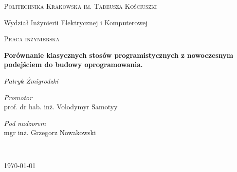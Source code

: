 \begin{titlepage}
	\centering
	{\scshape\LARGE Politechnika Krakowska 
	\break im. Tadeusza Kościuszki \par}
	\vspace{0.5cm}
	{\large Wydział Inżynierii Elektrycznej i Komputerowej\par}
	\vspace{1cm}
	{\scshape\LARGE Praca inżynierska\par}
	\vspace{1.5cm}
	{\LARGE\bfseries Porównanie klasycznych stosów programistycznych z nowoczesnym podejściem do budowy oprogramowania.\par}
	\vspace{1.5cm}
	{\LARGE\itshape Patryk Żmigrodzki\par}
	\vspace{1cm}

	\vfill
	
		\begin{minipage}{0.4\textwidth}
			\begin{flushleft} \large
				\emph{Promotor}\\
				prof. dr hab. inż. Volodymyr Samotyy
			\end{flushleft}
		\end{minipage}
		\begin{minipage}{0.4\textwidth}
			\begin{flushright} \large
				\emph{Pod nadzorem} \\
				mgr inż. Grzegorz Nowakowski
			\end{flushright}
		\end{minipage}\\[3cm]

	

	{\large \today\par}
\end{titlepage}